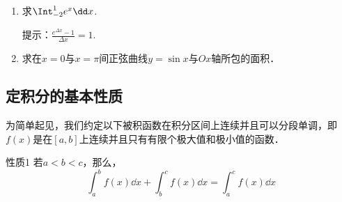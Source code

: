 \begin{ex}
\begin{enumerate}
    \item 求$\Int^1_{-2}e^x\dd x$. 

提示：$\frac{e^{\Delta x}-1}{\Delta x}=1$.    

\item 求在$x=0$与$x=\pi$间正弦曲线$y=\sin x$与$Ox$轴所包的面积．
\end{enumerate}
\end{ex}    

\subsection{定积分的基本性质}

为简单起见，我们约定以下被积函数在积分区间上连续并且可以分段单调，即$f(x)$是在$[a,b]$上连续并且只有有限个极大值和极小值的函数．

\begin{blk}{性质1}
若$a<b<c$，那么，
\[\int^b_a f(x)\dd x+\int^c_b f(x)\dd x=\int^c_a f(x)\dd x\]
\end{blk}

